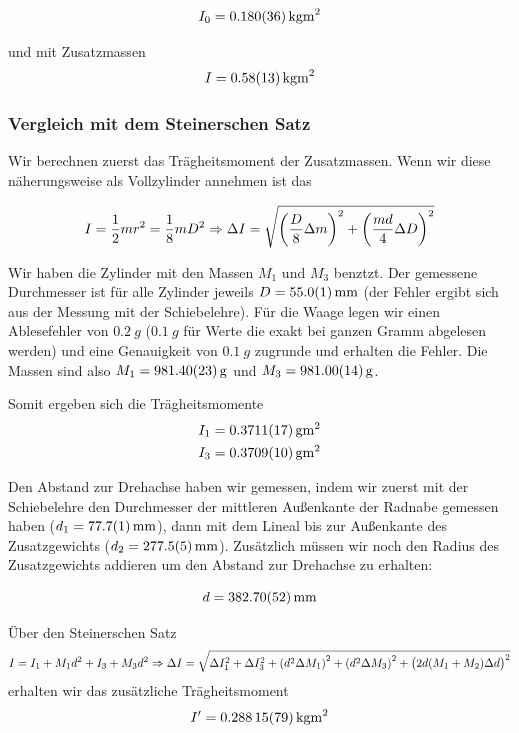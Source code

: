 \documentclass[a4paper,german,12pt,smallheadings]{scrartcl}
\begin{document}
\begin{equation}
  I_0 = \SI{0.180+-0.036}{kg m^2}
\end{equation}

und mit Zusatzmassen
\begin{equation}
  I = \SI{0.58+-0.13}{kg m^2}
\end{equation}

\subsubsection{Vergleich mit dem Steinerschen Satz}
Wir berechnen zuerst das Trägheitsmoment der Zusatzmassen. Wenn wir diese
näherungsweise als Vollzylinder annehmen ist das

\begin{equation}
  I = \frac{1}{2} m r^2 = \frac{1}{8} mD^2 \Rightarrow
  \Delta I = \sqrt{\del{\frac{D}{8} \Delta m}^2 + \del{\frac{md}{4} \Delta D}^2}
\end{equation}

Wir haben die Zylinder mit den Massen $M_1$ und $M_3$ benztzt. Der gemessene
Durchmesser ist für alle Zylinder jeweils $D = \SI{55.0+-0.1}{mm}$ (der Fehler
ergibt sich aus der Messung mit der Schiebelehre). Für die Waage legen wir
einen Ablesefehler von $\SI{0.2}{g}$ ($\SI{0.1}{g}$ für Werte die exakt bei
ganzen Gramm abgelesen werden) und eine Genauigkeit von $\SI{0.1}{g}$ zugrunde
und erhalten die Fehler. Die Massen sind also $M_1 = \SI{981.4+-0.23}{g}$ und $M_3 =
\SI{981.0+-0.14}{g}$.

Somit ergeben sich die Trägheitsmomente
\begin{align*}
  I_1 &= \SI{0.3711+-0.0017}{g m^2} \\
  I_3 &= \SI{0.3709+-0.0010}{g m^2}
\end{align*}

Den Abstand zur Drehachse haben wir gemessen, indem wir zuerst mit der
Schiebelehre den Durchmesser der mittleren Außenkante der Radnabe gemessen
haben ($d_1 = \SI{77.7+-0.1}{mm}$), dann mit dem Lineal bis zur Außenkante des
Zusatzgewichts ($d_2 = \SI{277.5+-0.5}{mm}$). Zusätzlich müssen wir noch den
Radius des Zusatzgewichts addieren um den Abstand zur Drehachse zu erhalten:

\begin{equation}
  d = \SI{382.70\pm0.52}{mm}
\end{equation}

Über den Steinerschen Satz
\begin{equation}
  I = I_1 + M_1 d^2 + I_3 + M_3 d^2 \Rightarrow
  \Delta I = \sqrt{\Delta I_1^2 + \Delta I_3^2 + \del{d^2 \Delta M_1}^2 +
  \del{d^2 \Delta M_3}^2 + \del{2d (M_1+M_2) \Delta d}^2}
\end{equation}
erhalten wir das zusätzliche Trägheitsmoment
\begin{equation}
  I' = \SI{0.28815+-0.00079}{kg m^2}
\end{equation}
\end{document}
